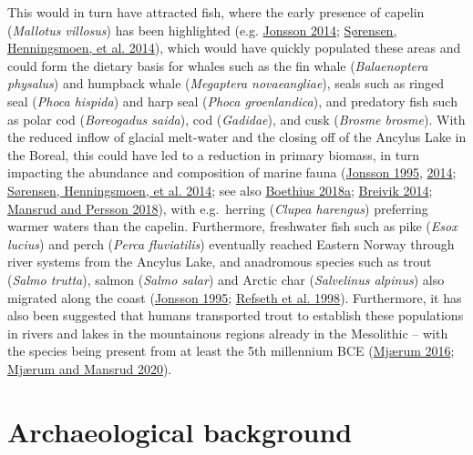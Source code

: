 \documentclass[
  12pt,
  a4paper,
  oneside]{book}
\begin{document}
This would in turn have attracted fish, where the early presence of capelin (\emph{Mallotus villosus}) has been highlighted (e.g. \protect\hyperlink{ref-jonsson2014}{Jonsson 2014}; \protect\hyperlink{ref-suxf8rensen2014}{Sørensen, Henningsmoen, et al. 2014}), which would have quickly populated these areas and could form the dietary basis for whales such as the fin whale (\emph{Balaenoptera physalus}) and humpback whale (\emph{Megaptera novaeangliae}), seals such as ringed seal (\emph{Phoca hispida}) and harp seal (\emph{Phoca groenlandica}), and predatory fish such as polar cod (\emph{Boreogadus saida}), cod (\emph{Gadidae}), and cusk (\emph{Brosme brosme}). With the reduced inflow of glacial melt-water and the closing off of the Ancylus Lake in the Boreal, this could have led to a reduction in primary biomass, in turn impacting the abundance and composition of marine fauna (\protect\hyperlink{ref-jonsson1995}{Jonsson 1995}, \protect\hyperlink{ref-jonsson2014}{2014}; \protect\hyperlink{ref-suxf8rensen2014}{Sørensen, Henningsmoen, et al. 2014}; see also \protect\hyperlink{ref-boethius2018}{Boethius 2018a}; \protect\hyperlink{ref-breivik2014}{Breivik 2014}; \protect\hyperlink{ref-mansrud2018}{Mansrud and Persson 2018}), with e.g.~herring (\emph{Clupea harengus}) preferring warmer waters than the capelin. Furthermore, freshwater fish such as pike (\emph{Esox lucius}) and perch (\emph{Perca fluviatilis}) eventually reached Eastern Norway through river systems from the Ancylus Lake, and anadromous species such as trout (\emph{Salmo trutta}), salmon (\emph{Salmo salar}) and Arctic char (\emph{Salvelinus alpinus}) also migrated along the coast (\protect\hyperlink{ref-jonsson1995}{Jonsson 1995}; \protect\hyperlink{ref-refseth1998}{Refseth et al. 1998}). Furthermore, it has also been suggested that humans transported trout to establish these populations in rivers and lakes in the mountainous regions already in the Mesolithic -- with the species being present from at least the 5th millennium BCE (\protect\hyperlink{ref-mjuxe6rum2016}{Mjærum 2016}; \protect\hyperlink{ref-mjuxe6rum2020}{Mjærum and Mansrud 2020}).

\hypertarget{archaeological-background}{%
\section{Archaeological background}\label{archaeological-background}}
\end{document}
